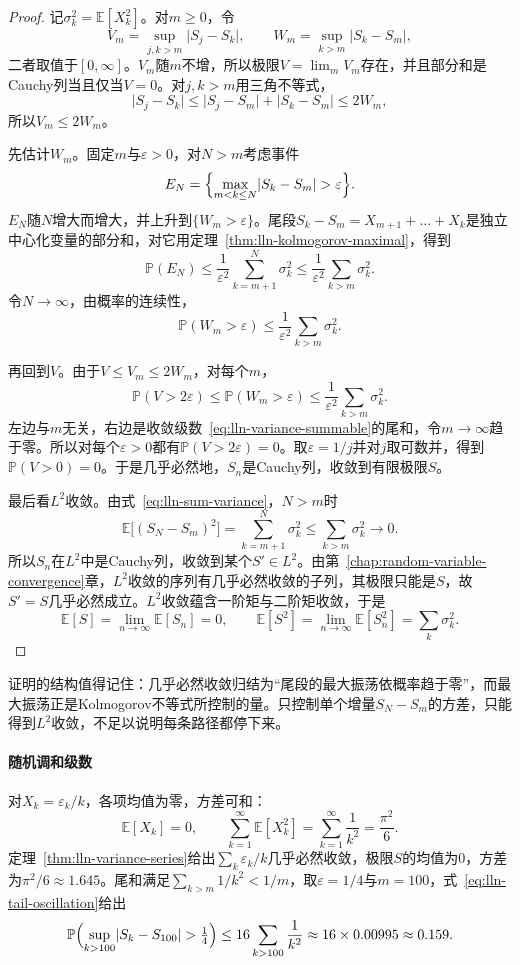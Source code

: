 \begin{proof}
记$\sigma_k^2=\mathbb{E}[X_k^2]$。对$m\geq0$，令
\[
 V_m=\sup_{j,k>m}\lvert S_j-S_k\rvert,\qquad W_m=\sup_{k>m}\lvert S_k-S_m\rvert ,
\]
二者取值于$[0,\infty]$。$V_m$随$m$不增，所以极限$V=\lim_mV_m$存在，并且部分和是Cauchy列当且仅当$V=0$。对$j,k>m$用三角不等式，
\[
 \lvert S_j-S_k\rvert\leq\lvert S_j-S_m\rvert+\lvert S_k-S_m\rvert\leq2W_m ,
\]
所以$V_m\leq2W_m$。

先估计$W_m$。固定$m$与$\varepsilon>0$，对$N>m$考虑事件
\[
 E_N=\Bigl\{\max_{m<k\leq N}\lvert S_k-S_m\rvert>\varepsilon\Bigr\} .
\]
$E_N$随$N$增大而增大，并上升到$\{W_m>\varepsilon\}$。尾段$S_k-S_m=X_{m+1}+\dots+X_k$是独立中心化变量的部分和，对它用定理~\ref{thm:lln-kolmogorov-maximal}，得到
\[
 \mathbb{P}(E_N)\leq\frac{1}{\varepsilon^2}\sum_{k=m+1}^{N}\sigma_k^2\leq\frac{1}{\varepsilon^2}\sum_{k>m}\sigma_k^2 .
\]
令$N\to\infty$，由概率的连续性，
\begin{equation}
 \mathbb{P}(W_m>\varepsilon)\leq\frac{1}{\varepsilon^2}\sum_{k>m}\sigma_k^2 .
 \label{eq:lln-tail-oscillation}
\end{equation}

再回到$V$。由于$V\leq V_m\leq2W_m$，对每个$m$，
\[
 \mathbb{P}(V>2\varepsilon)\leq\mathbb{P}(W_m>\varepsilon)\leq\frac{1}{\varepsilon^2}\sum_{k>m}\sigma_k^2 .
\]
左边与$m$无关，右边是收敛级数~\eqref{eq:lln-variance-summable}的尾和，令$m\to\infty$趋于零。所以对每个$\varepsilon>0$都有$\mathbb{P}(V>2\varepsilon)=0$。取$\varepsilon=1/j$并对$j$取可数并，得到$\mathbb{P}(V>0)=0$。于是几乎必然地，$S_n$是Cauchy列，收敛到有限极限$S$。

最后看$L^2$收敛。由式~\eqref{eq:lln-sum-variance}，$N>m$时
\[
 \mathbb{E}\bigl[(S_N-S_m)^2\bigr]=\sum_{k=m+1}^{N}\sigma_k^2\leq\sum_{k>m}\sigma_k^2\to0 .
\]
所以$S_n$在$L^2$中是Cauchy列，收敛到某个$S'\in L^2$。由第~\ref{chap:random-variable-convergence}章，$L^2$收敛的序列有几乎必然收敛的子列，其极限只能是$S$，故$S'=S$几乎必然成立。$L^2$收敛蕴含一阶矩与二阶矩收敛，于是
\[
 \mathbb{E}[S]=\lim_{n\to\infty}\mathbb{E}[S_n]=0,\qquad \mathbb{E}[S^2]=\lim_{n\to\infty}\mathbb{E}[S_n^2]=\sum_k\sigma_k^2 .
\]
\end{proof}

证明的结构值得记住：几乎必然收敛归结为“尾段的最大振荡依概率趋于零”，而最大振荡正是Kolmogorov不等式所控制的量。只控制单个增量$S_N-S_m$的方差，只能得到$L^2$收敛，不足以说明每条路径都停下来。

\paragraph{随机调和级数}
对$X_k=\varepsilon_k/k$，各项均值为零，方差可和：
\[
 \mathbb{E}[X_k]=0,\qquad \sum_{k=1}^{\infty}\mathbb{E}[X_k^2]=\sum_{k=1}^{\infty}\frac{1}{k^2}=\frac{\pi^2}{6} .
\]
定理~\ref{thm:lln-variance-series}给出$\sum_k\varepsilon_k/k$几乎必然收敛，极限$S$的均值为$0$，方差为$\pi^2/6\approx1.645$。尾和满足$\sum_{k>m}1/k^2<1/m$，取$\varepsilon=1/4$与$m=100$，式~\eqref{eq:lln-tail-oscillation}给出
\[
 \mathbb{P}\Bigl(\sup_{k>100}\lvert S_k-S_{100}\rvert>\tfrac14\Bigr)\leq16\sum_{k>100}\frac{1}{k^2}\approx16\times0.00995\approx0.159 .
\]

